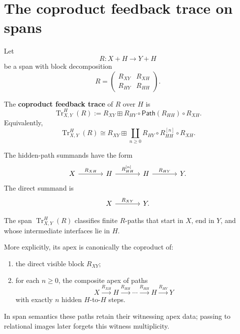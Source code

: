 \section{The coproduct feedback trace on spans}
\label{sec:coproduct-feedback-trace-spans}

Let
\[
  R:X+H\to Y+H
\]
be a span with block decomposition
\[
  R=
  \begin{pmatrix}
    R_{XY} & R_{XH}\\
    R_{HY} & R_{HH}
  \end{pmatrix}.
\]

\begin{definition}
\label{def:coproduct-feedback-trace}
The \textbf{coproduct feedback trace} of \(R\) over \(H\) is
\[
  \operatorname{Tr}^{H}_{X,Y}(R)
  :=
  R_{XY}
  \boxplus
  R_{HY}\circ\mathsf{Path}(R_{HH})\circ R_{XH}.
\]
Equivalently,
\[
  \operatorname{Tr}^{H}_{X,Y}(R)
  \cong
  R_{XY}
  \boxplus
  \coprod_{n\geq 0}
  R_{HY}\circ R_{HH}^{[n]}\circ R_{XH}.
\]
\end{definition}

The hidden-path summands have the form
\[
\begin{tikzcd}[column sep=large,row sep=large]
  X
    \ar[r,"R_{XH}"]
  &
  H
    \ar[r,"R_{HH}^{[n]}"]
  &
  H
    \ar[r,"R_{HY}"]
  &
  Y .
\end{tikzcd}
\]
The direct summand is
\[
\begin{tikzcd}[column sep=large,row sep=large]
  X
    \ar[r,"R_{XY}"]
  &
  Y .
\end{tikzcd}
\]

\begin{theorem}
\label{thm:hidden-path-normal-form}
The span \(\operatorname{Tr}^{H}_{X,Y}(R)\) classifies finite \(R\)-paths
that start in \(X\), end in \(Y\), and whose intermediate interfaces lie in
\(H\).

More explicitly, its apex is canonically the coproduct of:
\begin{enumerate}
  \item the direct visible block \(R_{XY}\);
  \item for each \(n\geq 0\), the composite apex of paths
  \[
    X\xrightarrow{R_{XH}}H
    \xrightarrow{R_{HH}}\cdots
    \xrightarrow{R_{HH}}H
    \xrightarrow{R_{HY}}Y
  \]
  with exactly \(n\) hidden \(H\)-to-\(H\) steps.
\end{enumerate}
In span semantics these paths retain their witnessing apex data; passing to
relational images later forgets this witness multiplicity.
\end{theorem}

